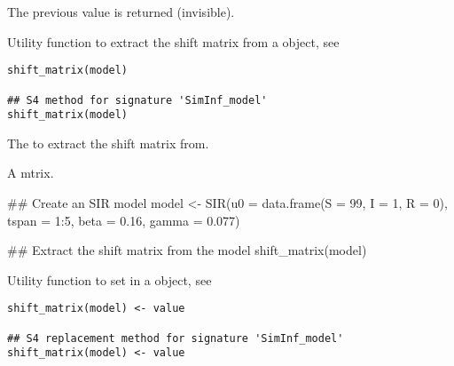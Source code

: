 \documentclass[letterpaper]{book}
\begin{document}
%
\begin{Value}
The previous value is returned (invisible).
\end{Value}
%
\begin{Description}
Utility function to extract the shift matrix  from
a  object, see
\end{Description}
%
\begin{Usage}
\begin{verbatim}
shift_matrix(model)

## S4 method for signature 'SimInf_model'
shift_matrix(model)
\end{verbatim}
\end{Usage}
%
\begin{Arguments}
\begin{ldescription}
\item[\code{model}] The  to extract the shift matrix
 from.
\end{ldescription}
\end{Arguments}
%
\begin{Value}
A mtrix.
\end{Value}
%
\begin{Examples}
\begin{ExampleCode}
## Create an SIR model
model <- SIR(u0 = data.frame(S = 99, I = 1, R = 0),
             tspan = 1:5, beta = 0.16, gamma = 0.077)

## Extract the shift matrix from the model
shift_matrix(model)
\end{ExampleCode}
\end{Examples}
%
\begin{Description}
Utility function to set  in a 
object, see 
\end{Description}
%
\begin{Usage}
\begin{verbatim}
shift_matrix(model) <- value

## S4 replacement method for signature 'SimInf_model'
shift_matrix(model) <- value
\end{verbatim}
\end{Usage}
\end{document}
